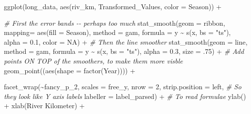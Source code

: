\documentclass[
]{article}
\newenvironment{Shaded}{\begin{snugshade}}{\end{snugshade}}
\newcommand{\AttributeTok}[1]{\textcolor[rgb]{0.77,0.63,0.00}{#1}}
\newcommand{\CommentTok}[1]{\textcolor[rgb]{0.56,0.35,0.01}{\textit{#1}}}
\newcommand{\ConstantTok}[1]{\textcolor[rgb]{0.00,0.00,0.00}{#1}}
\newcommand{\DecValTok}[1]{\textcolor[rgb]{0.00,0.00,0.81}{#1}}
\newcommand{\FloatTok}[1]{\textcolor[rgb]{0.00,0.00,0.81}{#1}}
\newcommand{\FunctionTok}[1]{\textcolor[rgb]{0.00,0.00,0.00}{#1}}
\newcommand{\NormalTok}[1]{#1}
\newcommand{\SpecialCharTok}[1]{\textcolor[rgb]{0.00,0.00,0.00}{#1}}
\newcommand{\StringTok}[1]{\textcolor[rgb]{0.31,0.60,0.02}{#1}}
\begin{document}
\begin{Shaded}
\begin{Highlighting}[]
\FunctionTok{ggplot}\NormalTok{(long\_data, }\FunctionTok{aes}\NormalTok{(riv\_km, Transformed\_Values, }\AttributeTok{color =}\NormalTok{ Season)) }\SpecialCharTok{+}

  \CommentTok{\# First the error bands {-}{-} perhaps too much }
  \FunctionTok{stat\_smooth}\NormalTok{(}\AttributeTok{geom =} \StringTok{\textquotesingle{}ribbon\textquotesingle{}}\NormalTok{,}
              \AttributeTok{mapping=} \FunctionTok{aes}\NormalTok{(}\AttributeTok{fill =}\NormalTok{ Season),}
              \AttributeTok{method =} \StringTok{\textquotesingle{}gam\textquotesingle{}}\NormalTok{,}
              \AttributeTok{formula =}\NormalTok{ y }\SpecialCharTok{\textasciitilde{}} \FunctionTok{s}\NormalTok{(x, }\AttributeTok{bs =} \StringTok{"ts"}\NormalTok{),}
              \AttributeTok{alpha =} \FloatTok{0.1}\NormalTok{,}
              \AttributeTok{color =} \ConstantTok{NA}\NormalTok{) }\SpecialCharTok{+}
  \CommentTok{\# Then the line smoother}
  \FunctionTok{stat\_smooth}\NormalTok{(}\AttributeTok{geom =} \StringTok{\textquotesingle{}line\textquotesingle{}}\NormalTok{,}
              \AttributeTok{method =} \StringTok{\textquotesingle{}gam\textquotesingle{}}\NormalTok{,}
              \AttributeTok{formula =}\NormalTok{ y }\SpecialCharTok{\textasciitilde{}} \FunctionTok{s}\NormalTok{(x, }\AttributeTok{bs =} \StringTok{"ts"}\NormalTok{),}
              \AttributeTok{alpha =} \FloatTok{0.3}\NormalTok{,}
              \AttributeTok{size =}\NormalTok{ .}\DecValTok{75}\NormalTok{) }\SpecialCharTok{+}
  \CommentTok{\# Add points ON TOP of the smoothers, to make them more visble}
  \FunctionTok{geom\_point}\NormalTok{((}\FunctionTok{aes}\NormalTok{(}\AttributeTok{shape =} \FunctionTok{factor}\NormalTok{(Year)))) }\SpecialCharTok{+}

  \FunctionTok{facet\_wrap}\NormalTok{(}\SpecialCharTok{\textasciitilde{}}\NormalTok{fancy\_p\_2, }
             \AttributeTok{scales =} \StringTok{\textquotesingle{}free\_y\textquotesingle{}}\NormalTok{, }
             \AttributeTok{nrow =} \DecValTok{2}\NormalTok{,}
             \AttributeTok{strip.position =} \StringTok{\textquotesingle{}left\textquotesingle{}}\NormalTok{,  }\CommentTok{\# So they look like Y axis labels}
             \AttributeTok{labeller =}\NormalTok{ label\_parsed) }\SpecialCharTok{+}  \CommentTok{\# To read formulae}
  \FunctionTok{ylab}\NormalTok{(}\StringTok{\textquotesingle{}\textquotesingle{}}\NormalTok{) }\SpecialCharTok{+}
  \FunctionTok{xlab}\NormalTok{(}\StringTok{\textquotesingle{}River Kilometer\textquotesingle{}}\NormalTok{) }\SpecialCharTok{+}
  

\end{Highlighting}
\end{Shaded}
\end{document}
